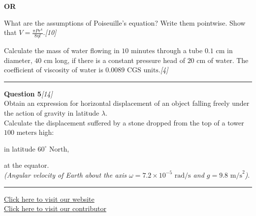 \documentclass[11pt,a4paper]{article}
\newcommand{\pts}[1]{\hfill   \textit{[#1]}}
\begin{document}
\begin{center}   \textbf{OR}\end{center}


\begin{parts}
  \item What are the assumptions of Poiseuille's equation? Write them pointwise. Show that $V = \frac{\pi P r^4}{8 \eta l}$.\pts{10}
  \item Calculate the mass of water flowing in $10 \text{ minutes}$ through a tube $0.1 \text{ cm}$ in diameter, $40 \text{ cm}$ long, if there is a constant pressure head of $20 \text{ cm}$ of water. The coefficient of viscosity of water is $0.0089 \text{ CGS units}$.\pts{4}
\end{parts}

\medskip\rule{\linewidth}{0.2pt}\medskip




\noindent   \textbf{Question 5}\pts{14} \\
Obtain an expression for horizontal displacement of an object falling freely under the action of gravity in latitude $\lambda$.\\
Calculate the displacement suffered by a stone dropped from the top of a tower $100 \text{ meters}$ high:

\begin{parts}[label=(\roman*)]
  \item in latitude $60^\circ \text{ North}$,
  \item at the equator.\\
   \textit{(Angular velocity of Earth about the axis $\omega = 7.2  \times 10^{-5} \text{ rad/s}$ and $g = 9.8 \text{ m/s}^2$)}.
\end{parts}

\vfill\rule{\linewidth}{0.4pt}

\begin{center}\small
\href{https://bhu-exam.vercel.app/}{Click here to visit our website}\\[4pt]
\href{https://me-aryan.vercel.app/}{Click here to visit our contributor}
\end{center}
\end{document}
